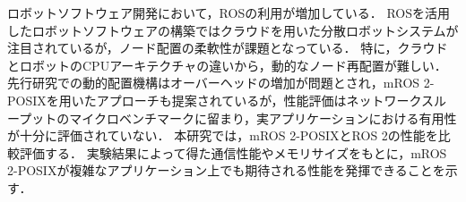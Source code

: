 ロボットソフトウェア開発において，ROSの利用が増加している．
ROSを活用したロボットソフトウェアの構築ではクラウドを用いた分散ロボットシステムが注目されているが，ノード配置の柔軟性が課題となっている．
特に，クラウドとロボットのCPUアーキテクチャの違いから，動的なノード再配置が難しい．
先行研究での動的配置機構はオーバーヘッドの増加が問題とされ，mROS 2-POSIXを用いたアプローチも提案されているが，性能評価はネットワークスループットのマイクロベンチマークに留まり，実アプリケーションにおける有用性が十分に評価されていない．
本研究では，mROS 2-POSIXとROS 2の性能を比較評価する．
実験結果によって得た通信性能やメモリサイズをもとに，mROS 2-POSIXが複雑なアプリケーション上でも期待される性能を発揮できることを示す．